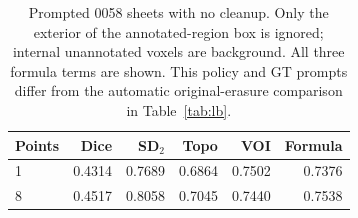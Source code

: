 \begin{table}[t]
\centering
\small
\setlength{\tabcolsep}{4pt}
\begin{tabular}{lrrrrr}
\toprule
Points & Dice & SD$_2$ & Topo & VOI & Formula \\
\midrule
1 & 0.4314 & 0.7689 & 0.6864 & 0.7502 & 0.7376 \\
8 & 0.4517 & 0.8058 & 0.7045 & 0.7440 & 0.7538 \\
\bottomrule
\end{tabular}
\caption{Prompted 0058 sheets with no cleanup. Only the exterior of the
annotated-region box is ignored; internal unannotated voxels are background.
All three formula terms are shown. This policy and GT prompts differ from
the automatic original-erasure comparison in Table~\ref{tab:lb}.}
\label{tab:promptmain}
\end{table}
